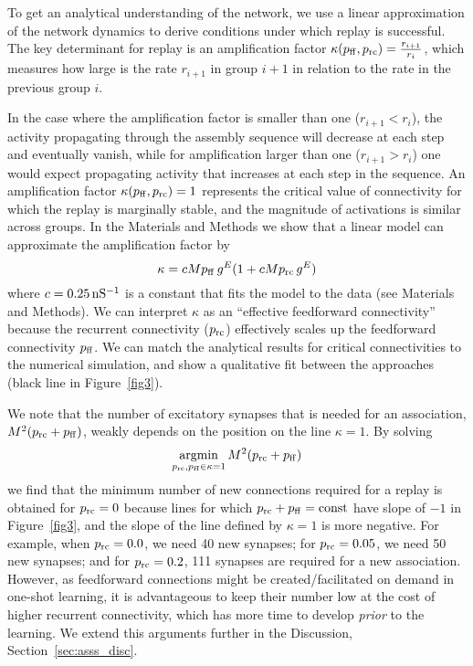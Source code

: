     To get an analytical understanding of the network, we use a linear
    approximation of the network dynamics to derive conditions under which
    replay is successful. The key determinant for replay is an amplification
    factor $\kappa(p_{\rm ff},p_{\rm rc}) = \frac{r_{i+1}}{r_i}$, which
    measures how large is the rate $r_{i+1}$ in group $i+1$ in relation to the
    rate in the previous group $i$.

    In the case where the amplification factor is smaller than one
    ($r_{i+1}<r_i$), the activity propagating through the assembly sequence
    will decrease at each step and eventually vanish, while for amplification
    larger than one ($r_{i+1}>r_i$) one would expect propagating activity that
    increases at each step in the sequence. An amplification factor
    $\kappa(p_{\rm ff},p_{\rm rc})=1$ represents the critical value of
    connectivity for which the replay is marginally stable, and the magnitude
    of activations is similar across groups. In the Materials and Methods we
    show that a linear model can approximate the amplification factor by
    \begin{equation}
      \kappa = c M p_{\rm ff}\, g^{E} (1 + c M p_{\rm rc} \,g^E)  
      \label{eq:kappa2}
    \end{equation}
    where $c = 0.25\, \rm{nS^{-1}}$ is a constant that fits the model to the
    data (see Materials and Methods).  We can interpret $\kappa$ as an
    ``effective feedforward connectivity'' because the recurrent connectivity
    ($p_{\rm rc}$) effectively scales up the feedforward connectivity $p_{\rm
    ff}$.  We can match the analytical results for critical connectivities to
    the numerical simulation, and show a qualitative fit between the approaches
    (black line in Figure~\ref{fig3}).

    We note that the number of excitatory synapses that is needed for an
    association, $M^2(p_{\rm rc}+p_{\rm ff})$, weakly depends on the position
    on the line $\kappa = 1$. By solving 
    \[\operatorname*{argmin}_{ p_{\rm rc}, p_{\rm ff} \in
    \kappa=1} M^2(p_{\rm rc} + p_{\rm ff})\]
    we find that the minimum number of new connections required for a replay is
    obtained for $p_{\rm rc}= 0$ because lines for which $p_{\rm rc} + p_{\rm
    ff} = \rm const$ have slope of $-1$ in Figure~\ref{fig3}, and the slope of
    the line defined by $\kappa=1$ is more negative. For example, when $p_{\rm
    rc}=0.0$, we need 40 new synapses; for $p_{\rm rc}=0.05$, we need 50 new
    synapses; and for $p_{\rm rc}=0.2$, 111 synapses are required for a new
    association.  However, as feedforward connections might be
    created/facilitated on demand in one-shot learning, it is advantageous to
    keep their number low at the cost of higher recurrent connectivity, which
    has more time to develop {\em prior} to the learning. We extend this
    arguments further in the Discussion, Section~\ref{sec:asss_disc}.

